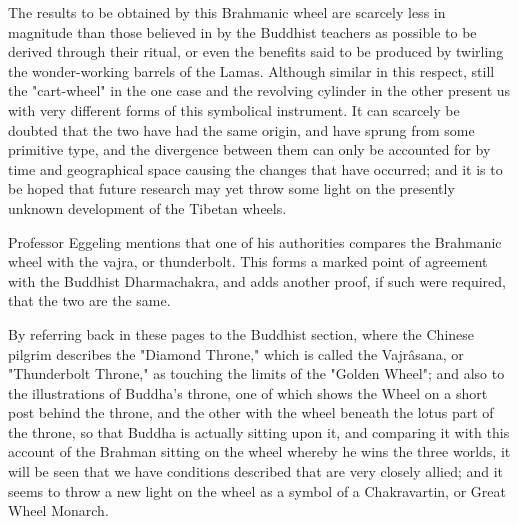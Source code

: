 \documentclass[a4paper, 11pt, oneside, polutonikogreek, english]{article}
\begin{document}
The results to be obtained by this Brahmanic wheel are scarcely less in magnitude than those believed in by the Buddhist teachers as possible to be derived through their ritual, or even the benefits said to be produced by twirling the wonder-working barrels of the Lamas. Although similar in this respect, still the "cart-wheel" in the one case and the revolving cylinder in the other present us with very different forms of this symbolical instrument. It can scarcely be doubted that the two have had the same origin, and have sprung from some primitive type, and the divergence between them can only be accounted for by time and geographical space causing the changes that have occurred; and it is to be hoped that future research may yet throw some light on the presently unknown development of the Tibetan wheels.

Professor Eggeling mentions that one of his authorities compares the Brahmanic wheel with the vajra, or thunderbolt. This forms a marked point of agreement with the Buddhist Dharmachakra, and adds another proof, if such were required, that the two are the same.

By referring back in these pages to the Buddhist section, where the Chinese pilgrim describes the "Diamond Throne," which is called the Vajrâsana, or "Thunderbolt Throne," as touching the limits of the "Golden Wheel"; and also to the illustrations of Buddha's throne, one of which shows the Wheel on a short post behind the throne, and the other with the wheel beneath the lotus part of the throne, so that Buddha is actually sitting upon it, and comparing it with this account of the Brahman sitting on the wheel whereby he wins the three worlds, it will be seen that we have conditions described that are very closely allied; and it seems to throw a new light on the wheel as a symbol of a Chakravartin, or Great Wheel Monarch.
\end{document}
